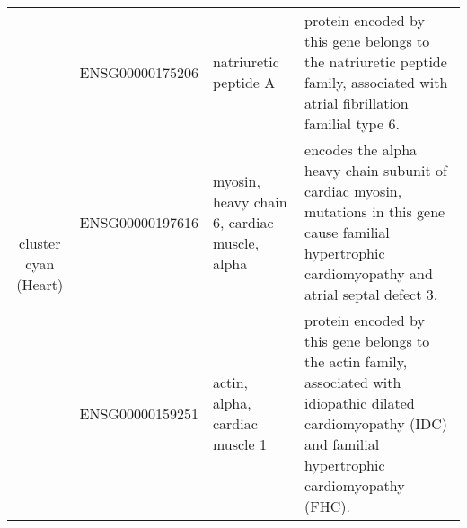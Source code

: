 \begin{table}
\begin{center}
\begin{tabular}{|c|c|p{1.9in}|p{2.5in}|}
 \multirow{3}{4em}{cluster cyan (Heart)} & ENSG00000175206 & natriuretic peptide A & \small{protein encoded by this gene belongs to the natriuretic peptide family, associated with atrial fibrillation familial type 6.} \\
 					      & ENSG00000197616 & myosin, heavy chain 6, cardiac muscle, alpha & \small{encodes the alpha heavy chain subunit of cardiac myosin, mutations in this gene cause familial hypertrophic cardiomyopathy and atrial septal defect 3.} \\
					      & ENSG00000159251 & actin, alpha, cardiac muscle 1 & \small{protein encoded by this gene belongs to the actin family, associated with idiopathic dilated cardiomyopathy (IDC) and familial hypertrophic cardiomyopathy (FHC).} \\
\hline		
 \end{tabular}
 \end{center}
\end{table}

